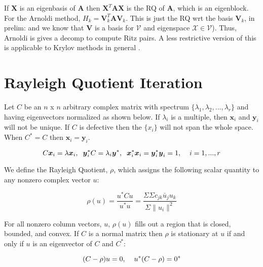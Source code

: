 \documentclass[12pt,twoside]{book}
\newcommand{\ve}[1]{\ensuremath{\mathbf{#1}}}
\begin{document}
If $\ve{X}$ is an eigenbasis of $\ve{A}$ then $\ve{X}^{T}\ve{A}\ve{X}$ is the RQ of $\ve{A}$, which is an eigenblock. For the Arnoldi method, ${H}_{k} = \ve{V}_{k}^{T}\ve{A}\ve{V}_{k}$. This is just the RQ wrt the basis $\ve{V}_{k}$, in prelim: and we know that $\ve{V}$ is a basis for $\mathcal{V}$ and eigenspace $\mathcal{X} \in \mathcal{V}$). Thus, Arnoldi is gives a decomp to compute Ritz pairs. A less restrictive version of this is applicable to Krylov methods in general \cite{Stewart1998}. 


\section{Rayleigh Quotient Iteration}
    Let $C$ be an $n$ x $n$ arbitrary complex matrix with spectrum $\{\lambda_{1}, \lambda_{2},...,\lambda_{r}\}$ and having eigenvectors normalized as shown below. If $\lambda_{i}$ is a multiple, then $\boldsymbol{x}_{i}$ and $\boldsymbol{y}_{i}$ will not be unique. If $C$ is defective then the $\{x_{i}\}$ will not span the whole space. When $C^{*} = C$ then $\boldsymbol{x}_{i} = \boldsymbol{y}_{i}$. 
    
    \begin{equation}
       C\boldsymbol{x}_{i} = \lambda\boldsymbol{x}_{i}, \hspace{.2cm} \boldsymbol{y}^{*}_{i}C = \lambda_{i}\boldsymbol{y}^{*}, \hspace{.2cm} \boldsymbol{x}^{*}_{i}\boldsymbol{x}_{i} = \boldsymbol{y}^{*}_{i}\boldsymbol{y}_{i} = 1, \hspace{.4cm} i = 1,...,r
    \end{equation}
    
    We define the Rayleigh Quotient, $\rho$, which assigns the following scalar quantity to any nonzero complex vector $u$:
    
    \begin{equation}
       \rho(u) = \frac{u^{*}Cu}{u^{*}u} = \frac{\Sigma\Sigma c_{jk}\bar{u}_{j}u_{k}}{\Sigma \|u_{i}\|^{2}}
    \end{equation}
    
    For all nonzero column vectors, $u$, $\rho(u)$ fills out a region that is closed, bounded, and convex. If $C$ is a normal matrix then $\rho$ is stationary at $u$ if and only if $u$ is an eigenvector of $C$ and $C^{*}$: 
    
    \begin{equation}
       (C - \rho)u = 0, \hspace{.4cm} u^{*}(C - \rho) = 0^{*}
    \end{equation}
    
\end{document}
